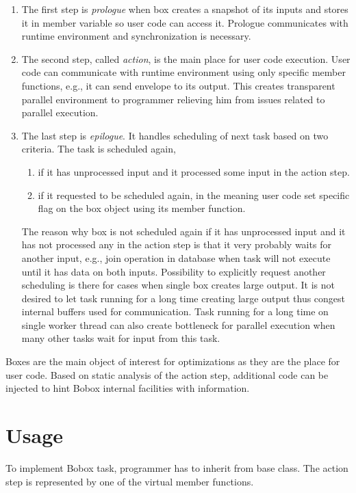 \begin{enumerate}
\item The first step is \emph{prologue} when box creates a snapshot of its inputs and stores it in member variable so user code can access it. Prologue communicates with runtime environment and synchronization is necessary.
\item The second step, called \emph{action}, is the main place for user code execution. User code can communicate with runtime environment using only specific member functions, e.g., it can send envelope to its output. This creates transparent parallel environment to programmer relieving him from issues related to parallel execution.
\item The last step is \emph{epilogue}. It handles scheduling of next task based on two criteria. The task is scheduled again,

\begin{enumerate}
\item if it has unprocessed input and it processed some input in the action step.
\item if it requested to be scheduled again, in the meaning user code set specific flag on the box object using its member function.
\end{enumerate}

The reason why box is not scheduled again if it has unprocessed input and it has not processed any in the action step is that it very probably waits for another input, e.g., join operation in database when task will not execute until it has data on both inputs. Possibility to explicitly request another scheduling is there for cases when single box creates large output. It is not desired to let task running for a long time creating large output thus congest internal buffers used for communication. Task running for a long time on single worker thread can also create bottleneck for parallel execution when many other tasks wait for input from this task.

\end{enumerate}

Boxes are the main object of interest for optimizations as they are the place for user code. Based on static analysis of the action step, additional code can be injected to hint Bobox internal facilities with information.

\section{Usage}
To implement Bobox task, programmer has to inherit from  base class. The action step is represented by one of the virtual member functions.

